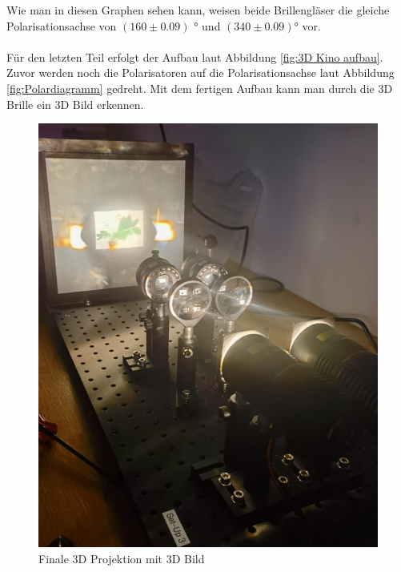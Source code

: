 \documentclass[12pt,a4paper,twoside]{article}
\begin{document}
\noindent
Wie man in diesen Graphen sehen kann, weisen beide Brillengläser die gleiche Polarisationsachse von $(160 \pm 0.09)$ ° und $(340 \pm 0.09)$° vor. 
\\
\\
Für den letzten Teil erfolgt der Aufbau laut Abbildung \ref{fig:3D Kino aufbau}. 
Zuvor werden noch die Polarisatoren auf die Polarisationsachse laut Abbildung \ref{fig:Polardiagramm} gedreht. 
Mit dem fertigen Aufbau kann man durch die 3D Brille ein 3D Bild erkennen. 

\begin{figure}[H]
    \centering
    \includegraphics[width=0.6\linewidth]{nudes/3d kino aufbau.jpg}
    \caption{Finale 3D Projektion mit 3D Bild}
    \label{fig:3D Projektion}
\end{figure}
\end{document}
